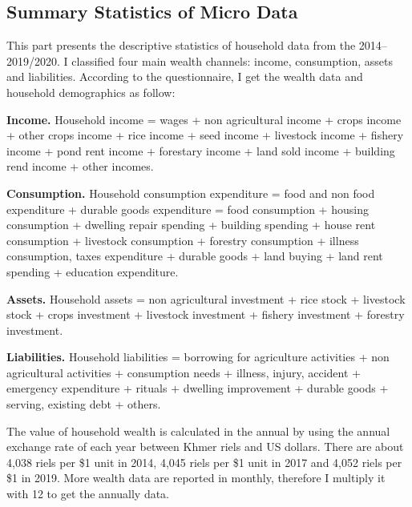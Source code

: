 \documentclass[11pt,letterpaper]{article}
\begin{document}
		    	


\subsection{Summary Statistics of Micro Data}\label{app:tabdata}
This part presents the descriptive statistics of household data from the 2014--2019/2020. I classified four main wealth channels: income, consumption, assets and liabilities. According to the questionnaire, I get the wealth data and household demographics as follow:  
\vspace{1.5em}

\noindent \textbf{Income.} Household income  = wages + non agricultural income + crops income + other crops income + rice income + seed income + livestock income + fishery income + pond rent income + forestary income + land sold income + building rend income + other incomes. 
\vspace{1em}

\noindent \textbf{Consumption.} Household consumption expenditure = food and non food expenditure + durable goods expenditure = food consumption + housing consumption + dwelling repair spending + building spending + house rent consumption + livestock consumption + forestry consumption + illness consumption, taxes expenditure + durable goods + land buying + land rent spending + education expenditure. 

\vspace{1em}

\noindent \textbf{Assets.} Household assets = non agricultural investment + rice stock + livestock stock + crops investment + livestock investment + fishery investment + forestry investment.

\vspace{1em}

\noindent \textbf{Liabilities.} Household liabilities = borrowing for agriculture activities + non agricultural activities + consumption needs + illness, injury, accident + emergency expenditure + rituals + dwelling improvement + durable goods + serving, existing debt + others. 

\vspace{1em}
\noindent The value of household wealth is calculated  in the annual by using the annual exchange rate of each year between Khmer riels and US dollars. There are about 4,038 riels per \$1 unit in 2014, 4,045 riels per \$1 unit in 2017 and 4,052 riels per \$1 in 2019. More wealth data are reported in monthly, therefore I multiply it with 12 to get the annually data. 
    
    
   
\clearpage
\end{document}
